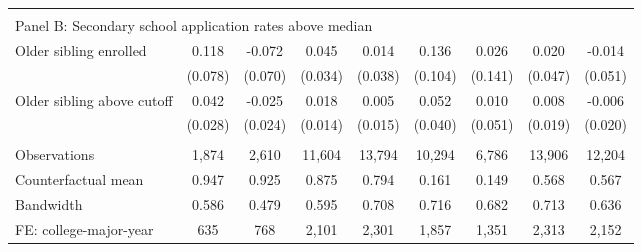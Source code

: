 {{\begin{tabular}{lcccccccc}
&  &  &  & & & & & &    \\
\multicolumn{9}{l}{Panel B: Secondary school application rates above median} \\
Older sibling enrolled&       0.118   &      -0.072   &       0.045   &       0.014   &       0.136   &       0.026   &       0.020   &      -0.014   \\
                    &     (0.078)   &     (0.070)   &     (0.034)   &     (0.038)   &     (0.104)   &     (0.141)   &     (0.047)   &     (0.051)   \\
 
Older sibling above cutoff&       0.042   &      -0.025   &       0.018   &       0.005   &       0.052   &       0.010   &       0.008   &      -0.006   \\
                    &     (0.028)   &     (0.024)   &     (0.014)   &     (0.015)   &     (0.040)   &     (0.051)   &     (0.019)   &     (0.020)   \\
                    &               &               &               &               &               &               &               &               \\
Observations        &       1,874   &       2,610   &      11,604   &      13,794   &      10,294   &       6,786   &      13,906   &      12,204   \\
Counterfactual mean &       0.947   &       0.925   &       0.875   &       0.794   &       0.161   &       0.149   &       0.568   &       0.567   \\
Bandwidth           &       0.586   &       0.479   &       0.595   &       0.708   &       0.716   &       0.682   &       0.713   &       0.636   \\
FE: college-major-year&         635   &         768   &       2,101   &       2,301   &       1,857   &       1,351   &       2,313   &       2,152   \\
 

\bottomrule
\end{tabular}
}
}
